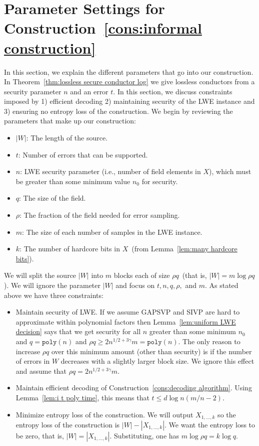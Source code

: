 \documentclass[11pt]{article}
\newcommand{\thref}[1]{\mbox{Theorem~\ref{#1}}}
\newcommand{\lemref}[1]{\mbox{Lemma~\ref{#1}}}
\newcommand{\consref}[1]{\mbox{Construction~\ref{#1}}}
\newcommand{\poly}{\ensuremath{\mathtt{poly}}\xspace}
\begin{document}
\section{Parameter Settings for \consref{cons:informal construction}}
\label{sec:parameter settings}
In this section, we explain the different parameters that go into our construction.  In \thref{thm:lossless secure conductor log} we give lossless conductors from a security parameter $n$ and an error $t$.  In this section, we discuss constraints imposed by 1) efficient decoding 2) maintaining security of the LWE instance and 3) ensuring no entropy loss of the construction.  We begin by reviewing the parameters that make up our construction:

\begin{itemize}
\item $|W|$: The length of the source.  
\item $t$: Number of errors that can be supported.  
\item $n$: LWE security parameter (i.e., number of field elements in $X$), which must be greater than some minimum value $n_0$ for security.
\item $q$: The size of the field.  
\item $\rho$: The fraction of the field needed for error sampling.  
\item $m$: The size of each number of samples in the LWE instance.  
\item $k$: The number of hardcore bits in $X$~(from \lemref{lem:many hardcore bits}).
\end{itemize}
We will split the source $|W|$ into $m$ blocks each of size $\rho q$~(that is, $|W| = m\log \rho q$).  We will ignore the parameter $|W|$ and focus on $t, n, q, \rho,$ and $m$.  As stated above we have three constraints:
\begin{itemize}
\item Maintain security of LWE.  If we assume GAPSVP and SIVP are hard to approximate within polynomial factors then \lemref{lem:uniform LWE decision} says that we get security for all $n$ greater than some minimum $n_0$ and $q = \poly(n)$ and $\rho q \geq 2 n^{1/2 + 3\gamma} m = \poly(n)$.  The only reason to increase $\rho q$ over this minimum amount (other than security) is if the number of errors in $W$ decreases with a slightly larger block size.  We ignore this effect and assume that $\rho q = 2n^{1/2+3\gamma}m$.
\item Maintain efficient decoding of Construction~\ref{cons:decoding algorithm}.  Using \lemref{lem:i t poly time}, this means that $t\leq d\log n(m/n-2)$.
\item Minimize entropy loss of the construction.  We will output $X_{1,...,k}$ so the entropy loss of the construction is $|W|-|X_{1,..., k}|$.  We want the entropy loss to be zero, that is, $|W| = |X_{1,..., k}|$.  Substituting, one has $m\log \rho q = k \log q$.
\end{itemize}
\end{document}
